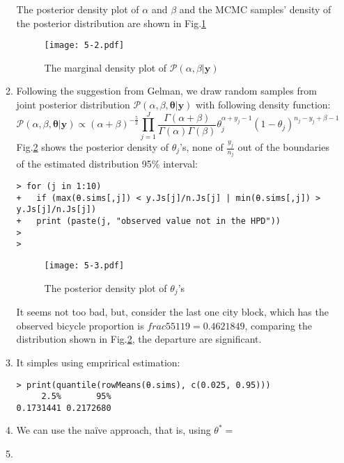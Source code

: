\documentclass[twoside,11pt]{amsart}
\begin{document}
\begin{enumerate}
\begin{enumerate}
    The posterior density plot of $\alpha$ and $\beta$ and the MCMC
    samples' density of the posterior distribution are shown in Fig.\ref{fig:5-2}
    \begin{figure}[h]
        \texttt{[image: 5-2.pdf]}
        \caption{The marginal density plot of $\mathscr P(\alpha, \beta|\bm y)$}\label{fig:5-2}
      \end{figure}
  \item
    Following the suggestion from Gelman, we draw random samples from
    joint posterior distribution $\mathscr P(\alpha, \beta,
    \bm\theta|\bm y)$ with following density function:
    \[\mathscr P(\alpha, \beta,
    \bm\theta|\bm y)\propto 
    (\alpha+\beta)^{-\frac{5}{2}}\prod_{j=1}^J\frac{\Gamma(\alpha+\beta)}{\Gamma(\alpha)\Gamma(\beta)}\theta_j^{\alpha+y_j-1}(1-\theta_j)^{n_j-y_j+\beta-1}
    \]
    Fig.\ref{fig:5-3} shows the posterior density of $\theta_j$'s,
    none of $\frac{y_j}{n_j}$ out of the boundaries of the estimated
    distribution 95\% interval:
    \begin{small}
    \begin{verbatim}
> for (j in 1:10)
+   if (max(θ.sims[,j]) < y.Js[j]/n.Js[j] | min(θ.sims[,j]) > y.Js[j]/n.Js[j])
+   print (paste(j, "observed value not in the HPD"))
>   
> 
    \end{verbatim}
    \end{small}
    \begin{figure}[h]
        \texttt{[image: 5-3.pdf]}
        \caption{The posterior density plot of $\theta_j$'s}\label{fig:5-3}
      \end{figure}
    It seems not too bad, but, consider the last one city block, which
    has the observed bicycle proportion is $frac{55}{119} = 0.4621849$, 
    comparing the distribution shown in Fig.\ref{fig:5-3}, the
    departure are significant. 
  \item
    It simples using emprirical estimation:
    \begin{verbatim}
> print(quantile(rowMeans(θ.sims), c(0.025, 0.95)))
     2.5%       95% 
0.1731441 0.2172680       
    \end{verbatim}
  \item
    We can use the na\"{i}ve approach, that is, using $\theta^*=$
  \item

  \end{enumerate}
  
\end{enumerate}
\end{document}
